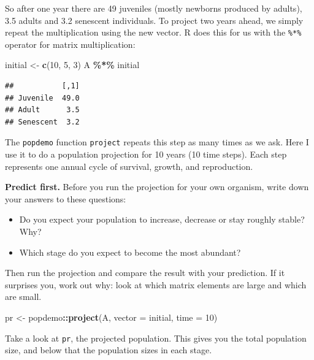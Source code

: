 \documentclass[
  a4paper]{book}
\newenvironment{Shaded}{\begin{snugshade}}{\end{snugshade}}
\newcommand{\AttributeTok}[1]{\textcolor[rgb]{0.13,0.29,0.53}{#1}}
\newcommand{\DecValTok}[1]{\textcolor[rgb]{0.00,0.00,0.81}{#1}}
\newcommand{\FunctionTok}[1]{\textcolor[rgb]{0.13,0.29,0.53}{\textbf{#1}}}
\newcommand{\NormalTok}[1]{#1}
\newcommand{\OtherTok}[1]{\textcolor[rgb]{0.56,0.35,0.01}{#1}}
\newcommand{\SpecialCharTok}[1]{\textcolor[rgb]{0.81,0.36,0.00}{\textbf{#1}}}
\providecommand{\tightlist}{%
  \setlength{\itemsep}{0pt}\setlength{\parskip}{0pt}}
\begin{document}
So after one year there are 49 juveniles (mostly newborns produced by adults), 3.5 adults and 3.2 senescent individuals. To project two years ahead, we simply repeat the multiplication using the new vector. R does this for us with the \texttt{\%*\%} operator for matrix multiplication:

\begin{Shaded}
\begin{Highlighting}[]
\NormalTok{initial }\OtherTok{\textless{}{-}} \FunctionTok{c}\NormalTok{(}\DecValTok{10}\NormalTok{, }\DecValTok{5}\NormalTok{, }\DecValTok{3}\NormalTok{)}
\NormalTok{A }\SpecialCharTok{\%*\%}\NormalTok{ initial}
\end{Highlighting}
\end{Shaded}

\begin{verbatim}
##           [,1]
## Juvenile  49.0
## Adult      3.5
## Senescent  3.2
\end{verbatim}

The \texttt{popdemo} function \texttt{project} repeats this step as many times as we ask. Here I use it to do a population projection for 10 years (10 time steps). Each step represents one annual cycle of survival, growth, and reproduction.

\textbf{Predict first.} Before you run the projection for your own organism, write down your answers to these questions:

\begin{itemize}
\tightlist
\item
  Do you expect your population to increase, decrease or stay roughly stable? Why?
\item
  Which stage do you expect to become the most abundant?
\end{itemize}

Then run the projection and compare the result with your prediction. If it surprises you, work out why: look at which matrix elements are large and which are small.

\begin{Shaded}
\begin{Highlighting}[]
\NormalTok{pr }\OtherTok{\textless{}{-}}\NormalTok{ popdemo}\SpecialCharTok{::}\FunctionTok{project}\NormalTok{(A, }\AttributeTok{vector =}\NormalTok{ initial, }\AttributeTok{time =} \DecValTok{10}\NormalTok{)}
\end{Highlighting}
\end{Shaded}

Take a look at \texttt{pr}, the projected population. This gives you the total population size, and below that the population sizes in each stage.
\end{document}

